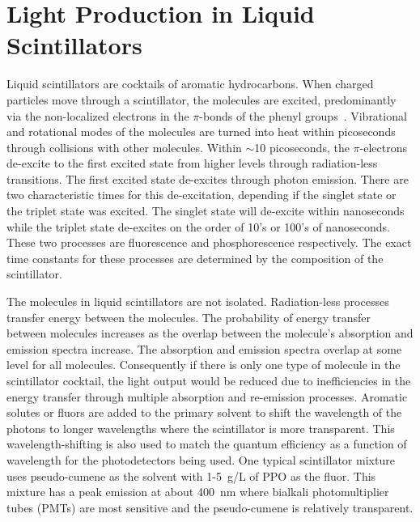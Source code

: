 \documentclass[aps,prc,twocolumn,groupedaddress,showpacs,amsmath,amssymb,floatfix,superscriptaddress]{revtex4}
\begin{document}
\section{Light Production in Liquid Scintillators}
Liquid scintillators are cocktails of aromatic hydrocarbons. When
charged particles move through a scintillator, the molecules are
excited, predominantly via the non-localized electrons in the
$\pi$-bonds of the phenyl groups~\cite{birks_book}. Vibrational
and rotational modes of the molecules are turned into heat within
picoseconds through collisions with other molecules.  Within $\sim$10
picoseconds, the $\pi$-electrons de-excite to the first excited state
from higher levels through radiation-less transitions. The first
excited state de-excites through photon emission. There are two
characteristic times for this de-excitation, depending if the singlet
state or the triplet state was excited.  The singlet state will
de-excite within nanoseconds while the triplet state de-excites on the
order of 10's or 100's of nanoseconds. These two processes are
fluorescence and phosphorescence respectively. The exact time
constants for these processes are determined by the composition of the
scintillator.

The molecules in liquid scintillators are not isolated. Radiation-less
processes transfer energy between the molecules. The probability of
energy transfer between molecules increases as the overlap between the
molecule's absorption and emission spectra increase. The absorption
and emission spectra overlap at some level for all
molecules. Consequently if there is only one type of molecule in the
scintillator cocktail, the light output would be reduced due to
inefficiencies in the energy transfer through multiple absorption and
re-emission processes. Aromatic solutes or fluors are added to the
primary solvent to shift the wavelength of the photons to longer
wavelengths where the scintillator is more transparent. This
wavelength-shifting is also used to match the quantum efficiency as a
function of wavelength for the photodetectors being used. One typical
scintillator mixture uses pseudo-cumene as the solvent with 1-5~g/L of
PPO as the fluor. This mixture has a peak emission at about 400~nm
where bialkali photomultiplier tubes (PMTs) are most sensitive and the
pseudo-cumene is relatively transparent.
\end{document}
